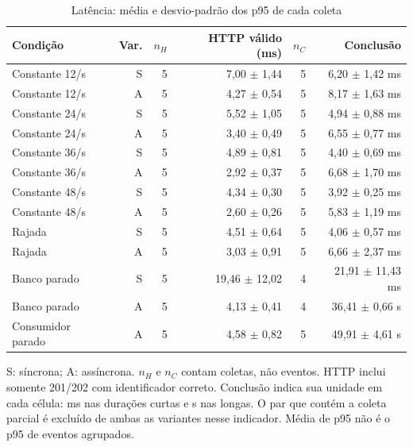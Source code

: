 \begin{table}[htbp]
\centering
\caption{Latência: média e desvio-padrão dos p95 de cada coleta}
\label{tab:final-latencia}
\small
\setlength{\tabcolsep}{4pt}
\begin{tabular}{lrrrrr}
\hline
Condição & Var. & $n_H$ & HTTP válido (ms) & $n_C$ & Conclusão \\ \hline
Constante 12/s & S & 5 & 7,00 $\pm$ 1,44 & 5 & 6,20 $\pm$ 1,42 ms \\
Constante 12/s & A & 5 & 4,27 $\pm$ 0,54 & 5 & 8,17 $\pm$ 1,63 ms \\
Constante 24/s & S & 5 & 5,52 $\pm$ 1,05 & 5 & 4,94 $\pm$ 0,88 ms \\
Constante 24/s & A & 5 & 3,40 $\pm$ 0,49 & 5 & 6,55 $\pm$ 0,77 ms \\
Constante 36/s & S & 5 & 4,89 $\pm$ 0,81 & 5 & 4,40 $\pm$ 0,69 ms \\
Constante 36/s & A & 5 & 2,92 $\pm$ 0,37 & 5 & 6,68 $\pm$ 1,70 ms \\
Constante 48/s & S & 5 & 4,34 $\pm$ 0,30 & 5 & 3,92 $\pm$ 0,25 ms \\
Constante 48/s & A & 5 & 2,60 $\pm$ 0,26 & 5 & 5,83 $\pm$ 1,19 ms \\
Rajada & S & 5 & 4,51 $\pm$ 0,64 & 5 & 4,06 $\pm$ 0,57 ms \\
Rajada & A & 5 & 3,03 $\pm$ 0,91 & 5 & 6,66 $\pm$ 2,37 ms \\
Banco parado & S & 5 & 19,46 $\pm$ 12,02 & 4 & 21,91 $\pm$ 11,43 ms \\
Banco parado & A & 5 & 4,13 $\pm$ 0,41 & 4 & 36,41 $\pm$ 0,66 s \\
Consumidor parado & A & 5 & 4,58 $\pm$ 0,82 & 5 & 49,91 $\pm$ 4,61 s \\
\hline
\end{tabular}
\vspace{0.2cm}
\begin{minipage}{\textwidth}
\footnotesize
S: síncrona; A: assíncrona. $n_H$ e $n_C$ contam coletas, não eventos. HTTP inclui somente 201/202 com identificador correto. Conclusão indica sua unidade em cada célula: ms nas durações curtas e s nas longas. O par que contém a coleta parcial é excluído de ambas as variantes nesse indicador. Média de p95 não é o p95 de eventos agrupados.
\end{minipage}
\end{table}
